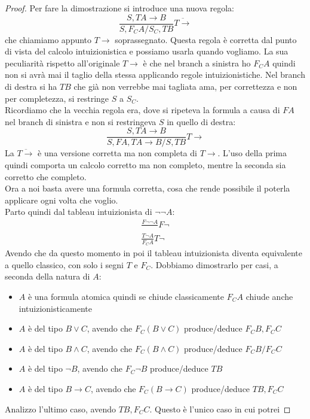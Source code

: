 \documentclass[a4paper,12pt, oneside]{book}
\begin{document}
\begin{proof}
  Per fare la dimostrazione si introduce una nuova regola:
  \[\frac{S, TA\to B}{S,F_CA/S_C, TB}\overline{T\to}\]
  che chiamiamo appunto $T\to$ soprassegnato. Questa regola è corretta dal punto
  di vista del calcolo intuizionistica e possiamo usarla quando vogliamo. La sua
  peculiarità rispetto all'originale $T\to$ è che nel branch a sinistra ho $F_C
  A$ quindi non si avrà mai il taglio della stessa applicando regole
  intuizionistiche. Nel branch di destra si ha $TB$ che già non verrebbe mai
  tagliata ama, per correttezza e non per completezza, si restringe $S$ a
  $S_C$.\\
  Ricordiamo che la vecchia regola era, dove si ripeteva la formula a causa di
  $FA$ nel branch di sinistra e non si restringeva $S$ in quello di destra:
  \[\frac{S, TA\to B}{S,FA, TA\to B/S, TB}T\to\]
  La $\overline{T\to}$ è una versione corretta ma non completa di $T\to$. L'uso
  della prima quindi comporta un calcolo corretto ma non completo, mentre la
  seconda sia corretto che completo.\\
  Ora a noi basta avere una formula corretta, cosa che rende possibile il
  poterla applicare ogni volta che voglio.\\
  Parto quindi dal tableau intuizionista di $\neg\neg A$:
  \begin{gather*}
    \frac{F\neg\neg A}{}F\neg\\
    \frac{T\neg A}{F_C A}T\neg
  \end{gather*}
  Avendo che da questo momento in poi il tableau intuizionista diventa
  equivalente a quello classico, con solo i segni $T$ e $F_C$. Dobbiamo
  dimostrarlo per casi, a seconda della natura di $A$:
  \begin{itemize}
    \item $A$ è una formula atomica quindi se chiude classicamente $F_CA$ chiude
    anche intuizionisticamente
    \item $A$ è del tipo $B\lor C$, avendo che $F_C (B\lor C)$ produce/deduce
    $F_CB,F_CC$
    \item $A$ è del tipo $B\land C$, avendo che $F_C (B\land C)$ produce/deduce
    $F_CB/F_CC$
    \item $A$ è del tipo $\neg B$, avendo che $F_C \neg B$ produce/deduce $TB$
    \item $A$ è del tipo $B\to C$, avendo che $F_C (B\to C)$ produce/deduce
    $TB,F_CC$
  \end{itemize}
  Analizzo l'ultimo caso, avendo $TB,F_CC$. Questo è l'unico caso in cui potrei

\end{proof}
\end{document}
